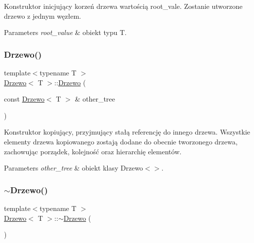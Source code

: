 Konstruktor inicjujący korzeń drzewa wartością \textquotesingle{}root\+\_\+vale\textquotesingle{}. Zostanie utworzone drzewo z jednym węzłem.


\begin{DoxyParams}{Parameters}
{\em root\+\_\+value} & obiekt typu T. \\
\hline
\end{DoxyParams}
\mbox{\label{class_drzewo_a337d26f83b35b414b729a147e8995c3e}} 
\subsubsection{\texorpdfstring{Drzewo()}{Drzewo()}\hspace{0.1cm}{\footnotesize\ttfamily [3/3]}}
{\footnotesize\ttfamily template$<$typename T $>$ \\
\hyperlink{class_drzewo}{Drzewo}$<$ T $>$\+::\hyperlink{class_drzewo}{Drzewo} (\begin{DoxyParamCaption}\item[{const \hyperlink{class_drzewo}{Drzewo}$<$ T $>$ \&}]{other\+\_\+tree }\end{DoxyParamCaption})}

Konstruktor kopiujący, przyjmujący stałą referencję do innego drzewa. Wszystkie elementy drzewa kopiowanego zostają dodane do obecnie tworzonego drzewa, zachowując porządek, kolejność oraz hierarchię elementów.


\begin{DoxyParams}{Parameters}
{\em other\+\_\+tree} & obiekt klasy Drzewo$<$$>$. \\
\hline
\end{DoxyParams}
\mbox{\label{class_drzewo_acbc76af50077660d8a75eaa4e086eac1}} 
\subsubsection{\texorpdfstring{$\sim$\+Drzewo()}{~Drzewo()}}
{\footnotesize\ttfamily template$<$typename T $>$ \\
\hyperlink{class_drzewo}{Drzewo}$<$ T $>$\+::$\sim$\hyperlink{class_drzewo}{Drzewo} (\begin{DoxyParamCaption}{ }\end{DoxyParamCaption})}

